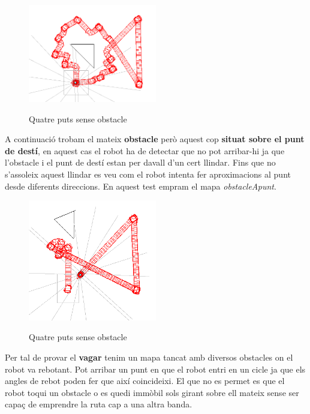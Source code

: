 \begin{figure}[H]
\begin{center}\label{4puntsObs}
 \includegraphics[width=0.5\textwidth]{diagrames/figures/4puntsObs.png}
\end{center}
  \caption{Quatre puts sense obstacle}
\end{figure}

A continuació trobam el mateix \textbf{obstacle} però aquest cop \textbf{situat sobre el punt de destí}, en aquest cas
el robot ha de detectar que no pot arribar-hi ja que l'obstacle i el punt de
destí estan per davall d'un cert llindar. Fins que no s'assoleix aquest llindar
es veu com el robot intenta fer aproximacions al punt desde diferents
direccions. En aquest test empram el mapa \emph{obstacleApunt}.

\begin{figure}[H]
\begin{center}\label{obsapunt}
 \includegraphics[width=0.5\textwidth]{diagrames/figures/obsapunt.png}
\end{center}
  \caption{Quatre puts sense obstacle}
\end{figure}

Per tal de provar el \textbf{vagar} tenim un mapa tancat amb diversos obstacles
on el robot va rebotant.
Pot arribar un punt en que el robot entri en un cicle ja que els angles de rebot
poden fer que així coincideixi. El que no es permet es que el robot toqui un
obstacle o es quedi immòbil sols girant sobre ell mateix sense ser capaç de
emprendre la ruta cap a una altra banda.

